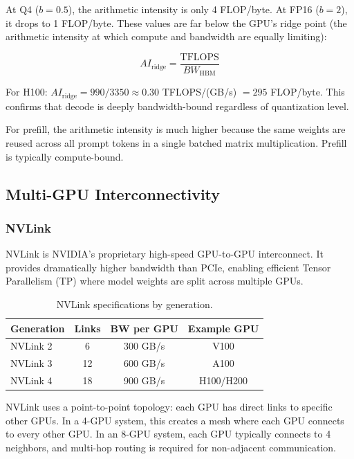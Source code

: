 \documentclass[11pt,a4paper]{article}
\theoremstyle{definition}
\begin{document}
At Q4 ($b = 0.5$), the arithmetic intensity is only 4 FLOP/byte. At FP16 ($b = 2$), it drops to 1 FLOP/byte. These values are far below the GPU's ridge point (the arithmetic intensity at which compute and bandwidth are equally limiting):

\begin{equation}\label{eq:ridge}
AI_{\text{ridge}} = \frac{\text{TFLOPS}}{BW_{\text{HBM}}}
\end{equation}

For H100: $AI_{\text{ridge}} = 990/3350 \approx 0.30$ TFLOPS/(GB/s) $= 295$ FLOP/byte. This confirms that decode is deeply bandwidth-bound regardless of quantization level.

For prefill, the arithmetic intensity is much higher because the same weights are reused across all prompt tokens in a single batched matrix multiplication. Prefill is typically compute-bound.

\subsection{Multi-GPU Interconnectivity}

\subsubsection{NVLink}

NVLink is NVIDIA's proprietary high-speed GPU-to-GPU interconnect. It provides dramatically higher bandwidth than PCIe, enabling efficient Tensor Parallelism (TP) where model weights are split across multiple GPUs.

\begin{table}[htbp]
\centering
\caption{NVLink specifications by generation.}\label{tab:nvlink}
\begin{tabular}{lccc}
\toprule
\textbf{Generation} & \textbf{Links} & \textbf{BW per GPU} & \textbf{Example GPU} \\
\midrule
NVLink 2 & 6 & 300 GB/s & V100 \\
NVLink 3 & 12 & 600 GB/s & A100 \\
NVLink 4 & 18 & 900 GB/s & H100/H200 \\
\bottomrule
\end{tabular}
\end{table}

NVLink uses a point-to-point topology: each GPU has direct links to specific other GPUs. In a 4-GPU system, this creates a mesh where each GPU connects to every other GPU. In an 8-GPU system, each GPU typically connects to 4 neighbors, and multi-hop routing is required for non-adjacent communication.
\end{document}
